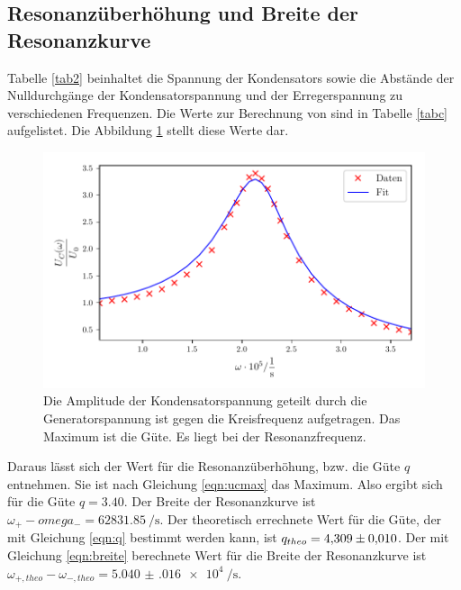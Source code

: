 \subsection{Resonanzüberhöhung und Breite der Resonanzkurve}
Tabelle \ref{tab2} beinhaltet die Spannung der Kondensators
sowie die Abstände der Nulldurchgänge der Kondensatorspannung
und der Erregerspannung zu verschiedenen Frequenzen.
Die Werte zur Berechnung von %
sind in Tabelle \ref{tabc} aufgelistet.
Die Abbildung \ref{fig:plotc} stellt diese Werte dar.


\begin{figure}
  \centering
  \includegraphics{build/plotc.pdf}
  \caption{Die Amplitude der Kondensatorspannung geteilt durch die Generatorspannung
  ist gegen die Kreisfrequenz aufgetragen. Das Maximum ist die Güte. Es liegt bei der
  Resonanzfrequenz.}
  \label{fig:plotc}
\end{figure}
\noindent Daraus lässt sich der Wert für die Resonanzüberhöhung, bzw. die Güte $q$ entnehmen.
Sie ist nach Gleichung \eqref{eqn:ucmax} das Maximum.
Also ergibt sich für die Güte $q = \num{3.40}$.
Der Breite der Resonanzkurve ist
$\omega_{+} - omega_{-} = \SI[per-mode=fraction]{62831.85}{\per\second}$. %
\newline
Der theoretisch errechnete Wert für die Güte, der mit Gleichung
\eqref{eqn:q} bestimmt werden kann, ist $q_{theo} = \num{4.309 \pm.010}$.
Der mit Gleichung \eqref{eqn:breite} berechnete Wert für die Breite der
Resonanzkurve ist
$\omega_{+,theo} - \omega_{-,theo} = \SI[per-mode=fraction]{5.040(016)e4}{\per\second}$.

